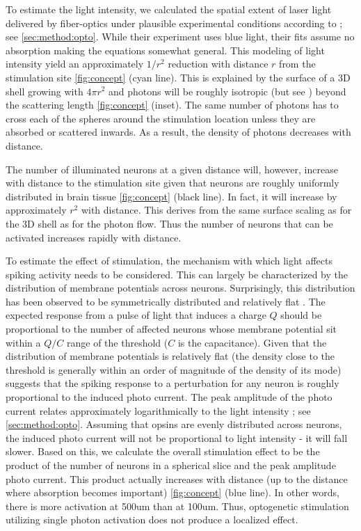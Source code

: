 \documentclass[11pt]{article}
\begin{document}
To estimate the light intensity, we calculated the spatial extent of laser light delivered by fiber-optics under plausible experimental conditions according to \citet{Aravanis2007}; see \cref{sec:method:opto}. 
While their experiment uses blue light, their fits assume no absorption making the equations somewhat general.
This modeling of light intensity yield an approximately $ 1/r^2 $ reduction with distance $ r $ from the stimulation site \cref{fig:concept} (cyan line). 
This is explained by the surface of a 3D shell growing with $4\pi r^2$ and photons will be roughly isotropic (but see \citep{thunemann2018does}) beyond the scattering length \cref{fig:concept} (inset). 
The same number of photons has to cross each of the spheres around the stimulation location unless they are absorbed or scattered inwards. 
As a result, the density of photons decreases with distance.

The number of illuminated neurons at a given distance will, however, increase with distance to the stimulation site given that neurons are roughly uniformly distributed in brain tissue \cref{fig:concept} (black line). 
In fact, it will increase by approximately $ r^2 $ with distance. 
This derives from the same surface scaling as for the 3D shell as for the photon flow. 
Thus the number of neurons that can be activated increases rapidly with distance.

To estimate the effect of stimulation, the mechanism with which light affects spiking activity needs to be considered. 
This can largely be characterized by the  distribution of membrane potentials across neurons. 
Surprisingly, this distribution has been observed to be symmetrically distributed and relatively flat \citep{pare1998impact,destexhe1999impact,rudolph2006use}. 
The expected response from a pulse of light that induces a charge $Q$ should be proportional to the number of affected neurons whose membrane potential sit within a $Q/C$ range of the threshold ($C$ is the capacitance). 
Given that the distribution of membrane potentials is relatively flat (the density close to the threshold is generally within an order of magnitude of the density of its mode) suggests that the spiking response to a perturbation for any neuron is roughly proportional to the induced photo current. 
The peak amplitude of the photo current relates approximately logarithmically to the light intensity \citep{wang2007high}; see \cref{sec:method:opto}. 
Assuming that opsins are evenly distributed across neurons, the induced photo current will not be proportional to light intensity - it will fall slower. 
Based on this, we calculate the overall stimulation effect to be the product of the number of neurons in a spherical slice and the peak amplitude photo current. 
This product actually increases with distance (up to the distance where absorption becomes important) \cref{fig:concept} (blue line). In other words, there is more activation at 500um than at 100um.
Thus, optogenetic stimulation utilizing single photon activation does not produce a localized effect.
\end{document}
